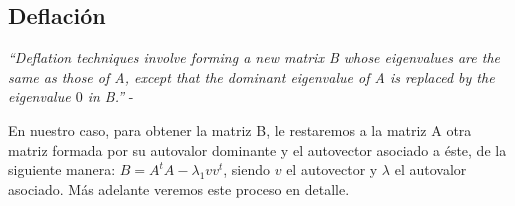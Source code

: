 \subsection{Deflaci\'on}

\textit{``Deflation techniques involve forming a new matrix B whose eigenvalues are the same as
  those of A, except that the dominant eigenvalue of A is replaced by the eigenvalue $0$ in B.''} -
\cite[p.~604]{burden}

En nuestro caso, para obtener la matriz B, le restaremos a la matriz A otra matriz formada por su
autovalor dominante y el autovector asociado a éste, de la siguiente manera: $B = A^t A -
\lambda_{1} v v^t $, siendo $v$ el autovector y $\lambda$ el autovalor asociado. Más adelante
veremos este proceso en detalle.
